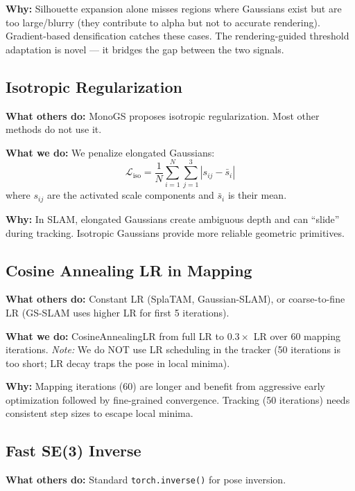 \documentclass[10pt,twocolumn]{article}
\begin{document}
\textbf{Why:} Silhouette expansion alone misses regions where Gaussians exist but are too large/blurry (they contribute to alpha but not to accurate rendering). Gradient-based densification catches these cases. The rendering-guided threshold adaptation is novel --- it bridges the gap between the two signals.

\subsection{Isotropic Regularization}

\textbf{What others do:} MonoGS proposes isotropic regularization. Most other methods do not use it.

\textbf{What we do:} We penalize elongated Gaussians:
\begin{equation}
\mathcal{L}_{\text{iso}} = \frac{1}{N} \sum_{i=1}^{N} \sum_{j=1}^{3} |s_{ij} - \bar{s}_i|
\end{equation}
where $s_{ij}$ are the activated scale components and $\bar{s}_i$ is their mean.

\textbf{Why:} In SLAM, elongated Gaussians create ambiguous depth and can ``slide'' during tracking. Isotropic Gaussians provide more reliable geometric primitives.

\subsection{Cosine Annealing LR in Mapping}

\textbf{What others do:} Constant LR (SplaTAM, Gaussian-SLAM), or coarse-to-fine LR (GS-SLAM uses higher LR for first 5 iterations).

\textbf{What we do:} CosineAnnealingLR from full LR to $0.3\times$ LR over 60 mapping iterations. \textit{Note:} We do NOT use LR scheduling in the tracker (50 iterations is too short; LR decay traps the pose in local minima).

\textbf{Why:} Mapping iterations (60) are longer and benefit from aggressive early optimization followed by fine-grained convergence. Tracking (50 iterations) needs consistent step sizes to escape local minima.

\subsection{Fast SE(3) Inverse}

\textbf{What others do:} Standard \texttt{torch.inverse()} for pose inversion.
\end{document}
